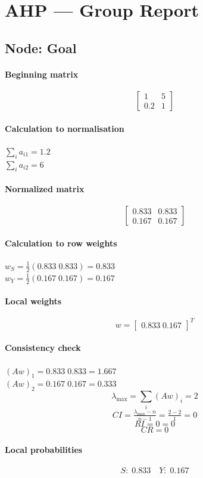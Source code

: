 \documentclass[11pt]{article}
\begin{document}
\section*{AHP — Group Report}
\subsection*{Node: Goal}
\paragraph{Beginning matrix}
\[\begin{bmatrix}
1 & 5 \\
0.2 & 1
\end{bmatrix}\]
\paragraph{Calculation to normalisation}
\(\sum_i a_{i1} = 1.2\) \\ \(\sum_i a_{i2} = 6\)
\paragraph{Normalized matrix}
\[\begin{bmatrix}
0.833 & 0.833 \\
0.167 & 0.167
\end{bmatrix}\]
\paragraph{Calculation to row weights}
\(w_{S} = \tfrac{1}{2}(0.833 \; 0.833) = 0.833\) \\ \(w_{Y} = \tfrac{1}{2}(0.167 \; 0.167) = 0.167\)
\paragraph{Local weights}
\[w = \begin{bmatrix} 0.833 \; 0.167 \end{bmatrix}^{\!T}\]
\paragraph{Consistency check}
\((Aw)_{1} = 0.833 \; 0.833 = 1.667\) \\ \((Aw)_{2} = 0.167 \; 0.167 = 0.333\)
\[\lambda_{\max} = \sum_i (Aw)_i = 2\]
\[CI = \tfrac{\lambda_{\max}-n}{n-1} = \tfrac{2 - 2}{1} = 0\]
\[RI = 0 = 0\]
\[CR = 0\]
\paragraph{Local probabilities}
\[S:\; 0.833\quad Y:\; 0.167\]
\end{document}

